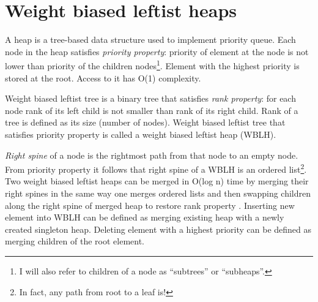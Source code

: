 \section{Weight biased leftist heaps}\label{sec:wblh}

A heap is a tree-based data structure used to implement priority queue. Each node in the heap satisfies \textit{priority property}: priority of element at the node is not lower than priority of the children nodes\footnote{I will also refer to children of a node as ``subtrees'' or ``subheaps''.}. Element with the highest priority is stored at the root. Access to it has O(1) complexity.

Weight biased leftist tree \cite{ChoSah96} is a binary tree that satisfies \textit{rank property}: for each node rank of its left child is not smaller than rank of its right child. Rank of a tree is defined as its size (number of nodes). Weight biased leftist tree that satisfies priority property is called a weight biased leftist heap (WBLH).

\textit{Right spine} of a node is the rightmost path from that node to an empty node. From priority property it follows that right spine of a WBLH is an ordered list\footnote{In fact, any path from root to a leaf is!}. Two weight biased leftist heaps can be merged in O(log n) time by merging their right spines in the same way one merges ordered lists and then swapping children along the right spine of merged heap to restore rank property \cite{Oka99}. Inserting new element into WBLH can be defined as merging existing heap with a newly created singleton heap. Deleting element with a highest priority can be defined as merging children of the root element.
